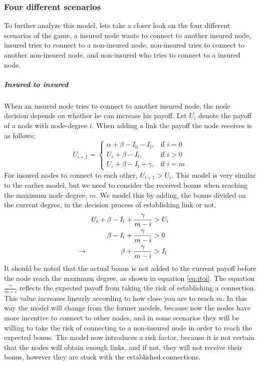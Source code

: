 \subsubsection{Four different scenarios}
To further analyze this model, lets take a closer look on the four different scenarios of the game, a insured node wants to connect to another insured node, insured tries to connect to a non-insured node, non-insured tries to connect to another non-insured node, and non-insured who tries to connect to a insured node.
\subparagraph{Insured to insured}
When an insured node tries to connect to another insured node, the node decision depends on whether he can increase his payoff. 
Let $U_{i}$ denote the payoff of a node with node-degree $i$. When adding a link the payoff the node receives is as follows:
\begin{equation}
    U_{i+1}= 
\begin{cases}
    \alpha + \beta - I_{0} - I_{l},& \text{if } i = 0\\
    U_{i}+\beta -I_{l},& \text{if }  i>0\\
    U_{i}+\beta -I_{l}+\gamma,& \text{if } i=m
    
\end{cases}
\label{eq:itoi}
\end{equation}
For insured nodes to connect to each other, $U_{i+1} > U_{i}$. This model is very similar to the earlier model, but we need to consider the received bonus when reaching the maximum node degree, $m$.
We model this by adding, the bonus divided on the current degree, in the decision process of establishing link or not. 
\begin{eqnarray}
U_{i}+\beta-I_{l}+\frac{\gamma}{m-i}&>U_{i} \nonumber \\ 
\beta-I_{l}+\frac{\gamma}{m-i}&>0 \nonumber \\ 
\llap{$\rightarrow$\hspace{50pt}} \beta+\frac{\gamma}{m-i}&>I_{l} 
\label{eq:itoi2}
\end{eqnarray}
It should be noted that the actual bonus is not added to the current payoff before the node reach the maximum degree, as shown in equation \ref{eq:itoi}. The equation $\frac{\gamma}{ m-i}$ reflects the expected payoff from taking the risk of establishing a connection. This value increases linearly according to how close you are to reach $m$.
In this way the model will change from the former models, because now the nodes have more incentive to connect to other nodes, and in some scenarios they will be willing to take the risk of connecting to a non-insured node in order to reach the expected bonus. The model now introduces a risk factor, because it is not certain that the nodes will obtain enough links, and if not, they will not receive their bonus, however they are stuck with the established connections. 

